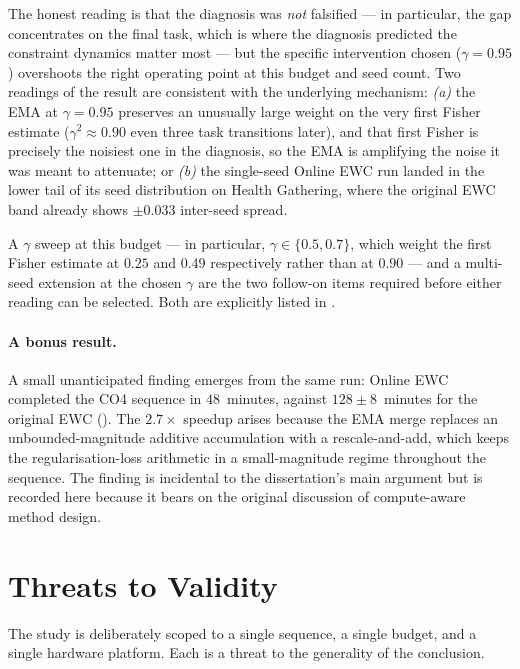 The honest reading is that the diagnosis was \emph{not}
falsified --- in particular, the gap concentrates on the
final task, which is where the diagnosis predicted the
constraint dynamics matter most --- but the specific
intervention chosen ($\gamma = 0.95$) overshoots the right
operating point at this budget and seed count. Two readings
of the result are consistent with the underlying mechanism:
\emph{(a)} the EMA at $\gamma = 0.95$ preserves an
unusually large weight on the very first Fisher estimate
($\gamma^{2} \approx 0.90$ even three task transitions
later), and that first Fisher is precisely the noisiest one
in the diagnosis, so the EMA is amplifying the noise it was
meant to attenuate; or \emph{(b)} the single-seed Online EWC
run landed in the lower tail of its seed distribution on
Health Gathering, where the original EWC band already shows
${\pm}0.033$ inter-seed spread.

A $\gamma$ sweep at this budget --- in particular,
$\gamma \in \{0.5, 0.7\}$, which weight the first Fisher
estimate at $0.25$ and $0.49$ respectively rather than at
$0.90$ --- and a multi-seed extension at the chosen
$\gamma$ are the two follow-on items required before either
reading can be selected. Both are explicitly listed in
.

\paragraph{A bonus result.}
A small unanticipated finding emerges from the same run:
Online EWC completed the CO4 sequence in $48$~minutes,
against $128 {\pm} 8$~minutes for the original EWC
(). The $2.7{\times}$ speedup arises
because the EMA merge replaces an unbounded-magnitude
additive accumulation with a rescale-and-add, which
keeps the regularisation-loss arithmetic in a
small-magnitude regime throughout the sequence. The
finding is incidental to the dissertation's main argument
but is recorded here because it bears on the original
 discussion of compute-aware method
design.

\section{Threats to Validity}
\label{sec:validity}

The study is deliberately scoped to a single sequence, a single
budget, and a single hardware platform. Each is a threat to the
generality of the conclusion.

